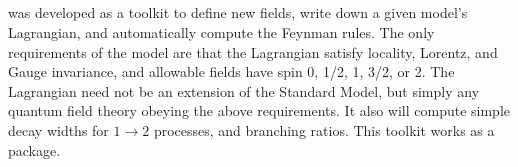 \subsection{\feynrules}
\feynrules was developed as a toolkit to define new fields, write down a given model's Lagrangian, and automatically compute the Feynman rules.
The only requirements of the model are that the Lagrangian satisfy locality, Lorentz, and Gauge invariance, and allowable fields have spin 0, 1/2, 1, 3/2, or 2. The Lagrangian need not be an extension of the Standard Model, but simply any quantum field theory obeying the above requirements. 
It also will compute simple decay widths for $1 \rightarrow 2$ processes, and branching ratios.
This toolkit works as a \mathematica package.
